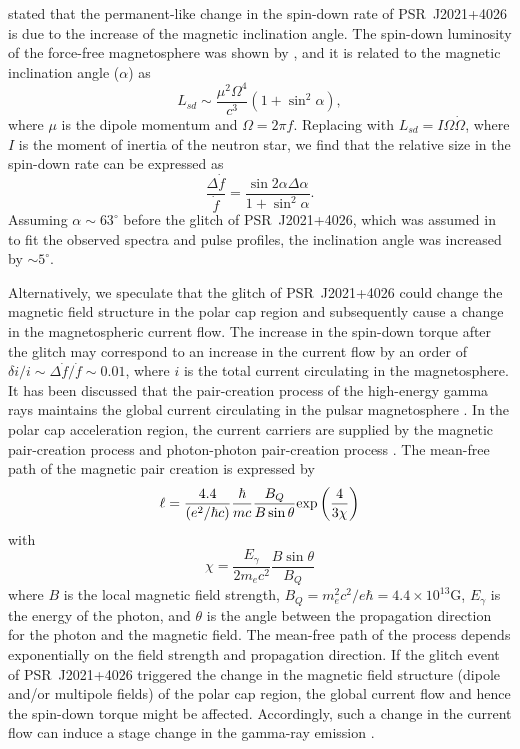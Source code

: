 \documentclass[12pt,preprint]{aastex}
\newcommand{\psr}{PSR~J2021+4026}
\begin{document}
\citet{ng16} stated that the permanent-like change in the spin-down rate of PSR~J2021+4026 is due to the increase of the magnetic inclination angle. 
The spin-down luminosity of the force-free magnetosphere was shown by \citet{spi06}, and it is related to the magnetic inclination angle ($\alpha$) as
\begin{equation}
  L_{sd}\sim \frac{\mu^2\Omega^4}{c^3}(1+\sin^2\alpha), 
\label{lsd}
\end{equation}
where $\mu$ is the dipole momentum and $\Omega=2\pi f$. Replacing with  $L_{sd}=I\Omega\dot{\Omega}$, where $I$ is the  moment of inertia of the neutron star, we find that  the relative size in the spin-down rate can be expressed as
\begin{equation}
  \frac{\Delta \dot{f}}{\dot{f}}=\frac{\sin 2\alpha \Delta \alpha}{1+\sin^2\alpha}.
\end{equation}
Assuming $\alpha\sim 63^{\circ}$ before the glitch of \psr, which was assumed in \citet{ng16} to fit the observed spectra and pulse profiles, the inclination angle was increased by $\sim 5^{\circ}$. 

Alternatively, we speculate that the glitch of PSR~J2021+4026 could change the magnetic field structure in the polar cap region and subsequently cause a change in the magnetospheric current flow. 
The increase in the spin-down torque after the glitch may correspond to an increase in the current flow by an order of $\delta i/i\sim \Delta \dot{f}/\dot{f}\sim 0.01$, where $i$ is the total current circulating in  the
magnetosphere.  It has been discussed that the pair-creation process of the high-energy gamma rays maintains the global current circulating in the pulsar magnetosphere \citep{wad11,yuk12}.
In the polar cap acceleration region, the current carriers are supplied by the magnetic pair-creation process and photon-photon pair-creation process \citep{dau96}. The mean-free path of the magnetic pair creation is expressed by  
\[ 
  \ell=\frac{4.4}{(e^2/\hbar c)}\frac{\hbar}{mc}\frac{B_Q}{B\sin\theta}
  {\rm exp}\left(\frac{4}{3\chi}\right)
      \]
\citep{rud75, tim15} with
\[
\chi=\frac{E_{\gamma}}{2m_ec^2}\frac{B\sin\theta}{B_Q}
\]
where $B$ is the local magnetic field strength, $B_Q=m_e^2c^2/e\hbar=4.4\times 10^{13}$G, $E_{\gamma}$ is the energy of the photon, and $\theta$ is the angle between the propagation direction for the photon and the magnetic field. 
The mean-free path of the process depends exponentially on the field strength and propagation direction.
If the glitch event of PSR~J2021+4026 triggered the change in the magnetic field structure (dipole and/or multipole fields) of the polar cap region, the global current flow and hence the spin-down torque might be affected.
Accordingly, such a change in the current flow can induce a stage change in the gamma-ray emission \citep{tak16}. 
\end{document}
